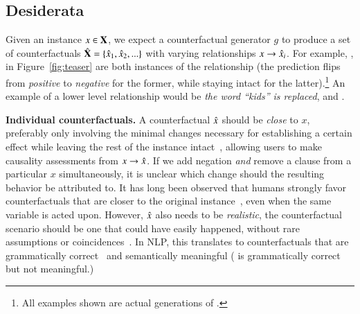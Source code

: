 \subsection{Desiderata}
Given an instance $x \in \mathbf{X}$, we expect a counterfactual generator $g$ to produce a set of counterfactuals $\hat{\mathbf{X}} = \{\hat{x}_1, \hat{x}_2, ...\}$ with varying relationships $x \rightarrow \hat{x}_i$.
For example, ,  in Figure~\ref{fig:teaser} are both instances of the  relationship (the prediction flips from \emph{positive} to \emph{negative} for the former, while staying intact for the latter).\footnote{All examples shown are actual generations of \sysname.} An example of a lower level relationship would be \emph{the word ``kids'' is replaced}, \eg {} and .

\textbf{Individual counterfactuals.} 
A counterfactual $\hat{x}$ should be \emph{close} to $x$, preferably only involving the minimal changes necessary for establishing a certain effect while leaving the rest of the instance intact~\cite{pearl2018causal}, allowing users to make causality assessments from $x \rightarrow \hat{x}$. 
If we add negation \emph{and} remove a clause from a particular $x$ simultaneously, it is unclear which change should the resulting behavior be attributed to. 
It has long been observed that humans strongly favor counterfactuals that are closer to the original instance~\cite{kahneman}, even when the same variable is acted upon.
However, $\hat{x}$ also needs to be \emph{realistic}, \ie the counterfactual scenario should be one that could have easily happened, without rare assumptions or coincidences~\cite{kahneman}. 
In NLP, this translates to counterfactuals that are grammatically correct~\cite{morris2020textattack} and semantically meaningful (\eg {} is grammatically correct but not meaningful.) 

